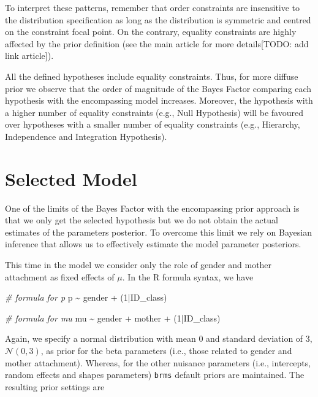 \documentclass[
]{book}
\newenvironment{Shaded}{\begin{snugshade}}{\end{snugshade}}
\newcommand{\CommentTok}[1]{\textcolor[rgb]{0.56,0.35,0.01}{\textit{#1}}}
\newcommand{\DecValTok}[1]{\textcolor[rgb]{0.00,0.00,0.81}{#1}}
\newcommand{\NormalTok}[1]{#1}
\newcommand{\SpecialCharTok}[1]{\textcolor[rgb]{0.00,0.00,0.00}{#1}}
\begin{document}
To interpret these patterns, remember that order constraints are insensitive to the distribution specification as long as the distribution is symmetric and centred on the constraint focal point. On the contrary, equality constraints are highly affected by the prior definition (see the main article for more details{[}TODO: add link article{]}).

All the defined hypotheses include equality constraints. Thus, for more diffuse prior we observe that the order of magnitude of the Bayes Factor comparing each hypothesis with the encompassing model increases. Moreover, the hypothesis with a higher number of equality constraints (e.g., Null Hypothesis) will be favoured over hypotheses with a smaller number of equality constraints (e.g., Hierarchy, Independence and Integration Hypothesis).

\hypertarget{selected-model-1}{%
\section{Selected Model}\label{selected-model-1}}

One of the limits of the Bayes Factor with the encompassing prior approach is that we only get the selected hypothesis but we do not obtain the actual estimates of the parameters posterior. To overcome this limit we rely on Bayesian inference that allows us to effectively estimate the model parameter posteriors.

This time in the model we consider only the role of gender and mother attachment as fixed effects of \(\mu\). In the R formula syntax, we have

\begin{Shaded}
\begin{Highlighting}[]
\CommentTok{\# formula for p}
\NormalTok{p }\SpecialCharTok{\textasciitilde{}}\NormalTok{ gender }\SpecialCharTok{+}\NormalTok{ (}\DecValTok{1}\SpecialCharTok{|}\NormalTok{ID\_class)}

\CommentTok{\# formula for mu}
\NormalTok{mu }\SpecialCharTok{\textasciitilde{}}\NormalTok{ gender }\SpecialCharTok{+}\NormalTok{ mother }\SpecialCharTok{+}\NormalTok{ (}\DecValTok{1}\SpecialCharTok{|}\NormalTok{ID\_class)}
\end{Highlighting}
\end{Shaded}

Again, we specify a normal distribution with mean 0 and standard deviation of 3, \(\mathcal{N}(0,3)\), as prior for the beta parameters (i.e., those related to gender and mother attachment). Whereas, for the other nuisance parameters (i.e., intercepts, random effects and shapes parameters) \texttt{brms} default priors are maintained. The resulting prior settings are
\end{document}
